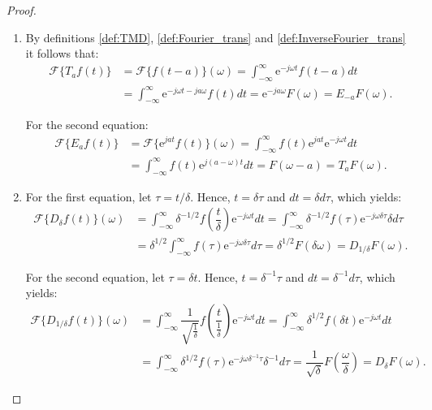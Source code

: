 \begin{proof}

\begin{enumerate}[label=(\alph*)]
\item
By definitions \ref{def:TMD}, \ref{def:Fourier_trans} and \ref{def:InverseFourier_trans} it follows that:
\begin{align*}
\mathcal{F}\{T_a f(t)\} &= \mathcal{F}\{f(t-a)\}(\omega) = \int_{-\infty}^\infty \text{e}^{-j\omega t} f(t - a) dt \\
&= \int_{-\infty}^\infty \text{e}^{-j \omega t - j a \omega} f(t) dt = \text{e}^{-j a \omega} F(\omega) = E_{-a} F(\omega).
\end{align*}

For the second equation:
\begin{align*}
\mathcal{F}\{E_a f(t)\} &= \mathcal{F}\{\text{e}^{jat} f(t)\}(\omega) = \int_{-\infty}^\infty f(t) \text{e}^{jat} \text{e}^{-j \omega t} dt \\
&= \int_{-\infty}^\infty f(t) \text{e}^{j(a- \omega)t} dt = F(\omega - a) = T_a F(\omega).
\end{align*}

\item For the first equation, let $\tau = t/\delta$. Hence, $t = \delta \tau$ and $dt = \delta d\tau$, which yields:
\begin{align*}
\mathcal{F}\{D_\delta f(t)\}(\omega) &= \int_{-\infty}^\infty \delta^{-1/2} f \left( \dfrac{t}{\delta} \right) \text{e}^{-j \omega t} dt = \int_{-\infty}^\infty \delta^{-1/2} f(\tau) \text{e}^{-j \omega \delta \tau} \delta d\tau \\
&= \delta^{1/2} \int_{-\infty}^\infty f(\tau) \text{e}^{-j \omega \delta\tau} d\tau = \delta^{1/2} F(\delta\omega) = D_{1/\delta} F(\omega).
\end{align*}

For the second equation, let $\tau = \delta t$. Hence, $t = \delta^{-1}\tau$ and $dt = \delta^{-1} d\tau$, which yields:
\begin{align*}
\mathcal{F}\{D_{1/\delta} f(t)\}(\omega) &= \int_{-\infty}^\infty \dfrac{1}{\sqrt{\frac{1}{\delta}}} f \left( \dfrac{t}{\frac{1}{\delta}} \right) \text{e}^{-j \omega t} dt = \int_{-\infty}^\infty \delta^{1/2} f( \delta t) \text{e}^{-j \omega t} dt \\
&= \int_{-\infty}^\infty \delta^{1/2} f(\tau) \text{e}^{-j \omega \delta^{-1} \tau} \delta^{-1} d\tau = \dfrac{1}{\sqrt{\delta}} F \left( \dfrac{\omega}{\delta} \right) = D_\delta F(\omega).
\end{align*}


\end{enumerate}
\end{proof}
